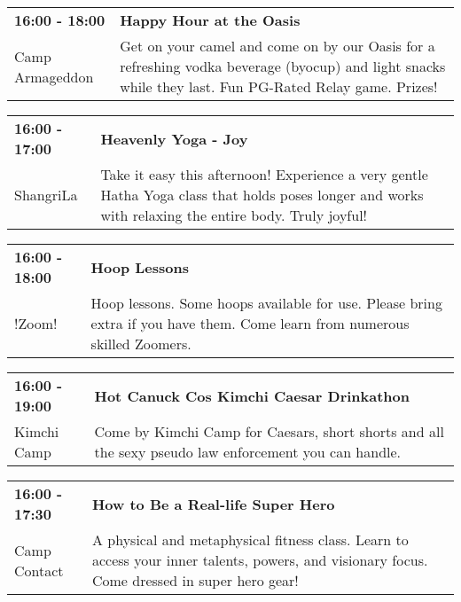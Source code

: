 \begin{tabular}{ p{1in} p{2.2in} }
    \textbf{16:00 - 18:00} & \textbf{Happy Hour at the Oasis} \\
    Camp Armageddon \newline  & Get on your camel and come on by our Oasis for a refreshing vodka beverage (byocup) and light snacks while they last. Fun PG-Rated Relay game. Prizes! \\
    \hline 
\end{tabular}
    
\begin{tabular}{ p{1in} p{2.2in} }
    \textbf{16:00 - 17:00} & \textbf{Heavenly Yoga - Joy} \\
    ShangriLa \newline  & Take it easy this afternoon! Experience a very gentle Hatha Yoga class that holds poses longer and works with relaxing the entire body. Truly joyful! \\
    \hline 
\end{tabular}
    
\begin{tabular}{ p{1in} p{2.2in} }
    \textbf{16:00 - 18:00} & \textbf{Hoop Lessons} \\
    !Zoom! \newline  & Hoop lessons.  Some hoops available for use.  Please bring extra if you have them.  Come learn from numerous skilled Zoomers. \\
    \hline 
\end{tabular}
    
\begin{tabular}{ p{1in} p{2.2in} }
    \textbf{16:00 - 19:00} & \textbf{Hot Canuck Cos Kimchi Caesar Drinkathon} \\
    Kimchi Camp \newline  & Come by Kimchi Camp for Caesars, short shorts and all the sexy pseudo law enforcement you can handle. \\
    \hline 
\end{tabular}
    
\begin{tabular}{ p{1in} p{2.2in} }
    \textbf{16:00 - 17:30} & \textbf{How to Be a Real-life Super Hero} \\
    Camp Contact \newline  & A physical and metaphysical fitness class.  Learn to access your inner talents, powers, and visionary focus. Come dressed in super hero gear! \\
    \hline 
\end{tabular}
    
